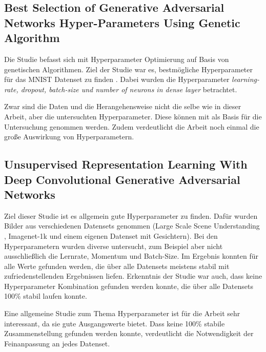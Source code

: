 \subsection{Best Selection of Generative Adversarial Networks Hyper-Parameters Using Genetic Algorithm \cite{hyperparameters-genetic-algorithm}}
Die Studie befasst sich mit Hyperparameter Optimierung auf Basis von genetischen Algorithmen.
Ziel der Studie war es, bestmögliche Hyperparameter für das MNIST Datenset zu finden \cite{dataset:mnist}.
Dabei wurden die Hyperparameter \textit{learning-rate, dropout, batch-size und number of neurons in dense layer} betrachtet.
\newline

Zwar sind die Daten und die Herangehensweise nicht die selbe wie in dieser Arbeit, aber die untersuchten Hyperparameter.
Diese können mit als Basis für die Untersuchung genommen werden.
Zudem verdeutlicht die Arbeit noch einmal die große Auswirkung von Hyperparametern.

\subsection{Unsupervised Representation Learning With Deep Convolutional Generative Adversarial Networks \cite{hyperparameters-convolutional-gan}}
Ziel dieser Studie ist es allgemein gute Hyperparameter zu finden.
Dafür wurden Bilder aus verschiedenen Datensets genommen (Large Scale Scene Understanding \cite{dataset:lsun}, Imagenet-1k \cite{dataset:image-net} und einem eigenen Datenset mit Gesichtern).
Bei den Hyperparametern wurden diverse untersucht, zum Beispiel aber nicht ausschließlich die Lernrate, Momentum und Batch-Size.
Im Ergebnis konnten für alle Werte gefunden werden, die über alle Datensets meistens stabil mit zufriedenstellenden Ergebnissen liefen.
Erkenntnis der Studie war auch, dass keine Hyperparameter Kombination gefunden werden konnte, die über alle Datensets 100\% stabil laufen konnte.
\newline

Eine allgemeine Studie zum Thema Hyperparameter ist für die Arbeit sehr interessant, da sie gute Ausgangswerte bietet.
Dass keine 100\% stabile Zusammenstellung gefunden werden konnte, verdeutlicht die Notwendigkeit der Feinanpassung an jedes Datenset.


